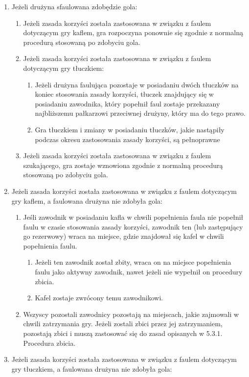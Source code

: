 \documentclass[12pt]{article}
\begin{document}
\begin{enumerate}
\item
    Jeżeli drużyna sfaulowana zdobędzie gola:
  
  \begin{enumerate}
  \item
        Jeżeli zasada korzyści została zastosowana w związku z faulem
    dotyczącym gry kaflem, gra rozpoczyna ponownie się zgodnie z
    normalną procedurą stosowaną po zdobyciu gola.
      \item
        Jeżeli zasada korzyści została zastosowana w związku z faulem
    dotyczącym gry tłuczkiem:
    
    \begin{enumerate}
    \item
            Jeżeli drużyna faulująca pozostaje w posiadaniu dwóch tłuczków na
      koniec stosowania zasady korzyści, tłuczek znajdujący się w
      posiadaniu zawodnika, który popełnił faul zostaje przekazany
      najbliższemu pałkarzowi przeciwnej drużyny, który ma do tego
      prawo.
          \item
            Gra tłuczkiem i zmiany w posiadaniu tłuczków, jakie nastąpiły
      podczas okresu zastosowania zasady korzyści, są pełnoprawne
          \end{enumerate}
  \item
        Jeżeli zasada korzyści została zastosowana w związku z faulem
    szukającego, gra zostaje wznowiona zgodnie z normalną procedurą
    stosowaną po zdobyciu gola.
      \end{enumerate}
\item
    Jeżeli zasada korzyści została zastosowana w związku z faulem
  dotyczącym gry kaflem, a faulowana drużyna nie zdobyła gola:
  
  \begin{enumerate}
  \item
        Jeśli zawodnik w posiadaniu kafla w chwili popełnienia faula nie
    popełnił faulu w czasie stosowania zasady korzyści, zawodnik ten
    (lub zastępujący go rezerwowy) wraca na miejsce, gdzie znajdował się
    kafel w chwili popełnienia faulu.
    
    \begin{enumerate}
    \item
            Jeżeli ten zawodnik został zbity, wraca on na miejsce popełnienia
      faulu jako aktywny zawodnik, nawet jeżeli nie wypełnił on
      procedury zbicia.
          \item
            Kafel zostaje zwrócony temu zawodnikowi.
          \end{enumerate}
  \item
        Wszyscy pozostali zawodnicy pozostają na miejscach, jakie zajmowali
    w chwili zatrzymania gry. Jeżeli zostali zbici przez jej
    zatrzymaniem, pozostają zbici i muszą zastosować się do zasad
    opisanych w 5.3.1. Procedura zbicia.
      \end{enumerate}
\item
    Jeżeli zasada korzyści została zastosowana w związku z faulem
  dotyczącym gry tłuczkiem, a faulowana drużyna nie zdobyła gola:
  

\end{enumerate}
\end{document}
